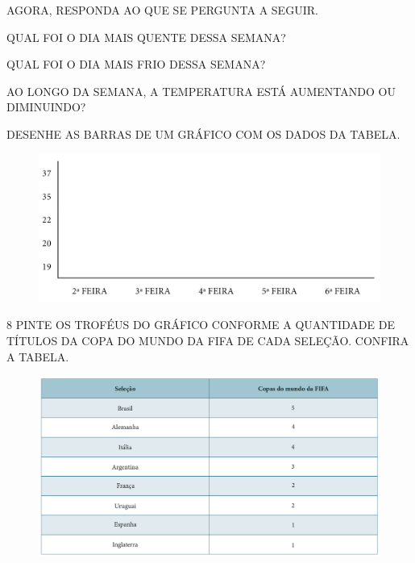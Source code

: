 AGORA, RESPONDA AO QUE SE PERGUNTA A SEGUIR.

\begin{escolha}
\item QUAL FOI O DIA MAIS QUENTE DESSA SEMANA?

\item QUAL FOI O DIA MAIS FRIO DESSA SEMANA?

\item AO LONGO DA SEMANA, A TEMPERATURA ESTÁ AUMENTANDO OU DIMINUINDO?

\item DESENHE AS BARRAS DE UM GRÁFICO COM OS DADOS DA TABELA.

\begin{figure}[htpb!]
\centering
\includegraphics[width=\textwidth]{./media/SAEB_1ANO_MAT_FIGURA106.png}
\end{figure}

\end{escolha}


\num{8} PINTE OS TROFÉUS DO GRÁFICO CONFORME A QUANTIDADE DE TÍTULOS DA COPA DO
MUNDO DA FIFA DE CADA SELEÇÃO. CONFIRA A TABELA.

\begin{figure}[htpb!]
\centering
\includegraphics[width=\textwidth]{./media/SAEB_1ANO_MAT_FIGURA107.png}
\end{figure}

